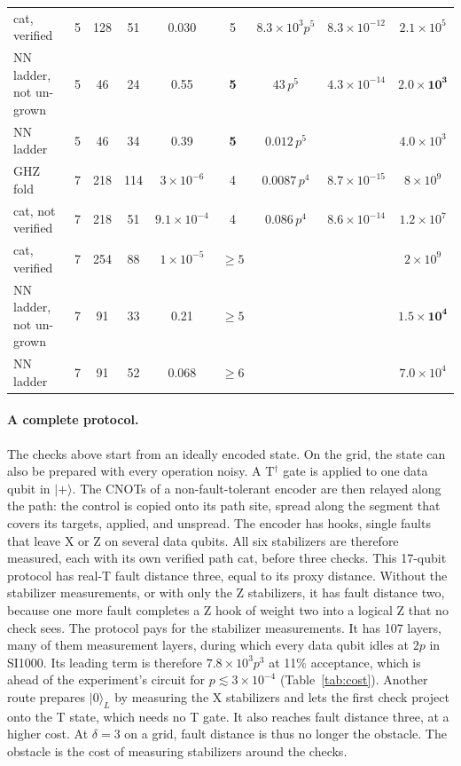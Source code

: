 \documentclass[aps,prl,reprint,twocolumn,amsmath,amssymb,floatfix,nofootinbib,superscriptaddress]{revtex4-2}
\theoremstyle{definition}
\theoremstyle{remark}
\begin{document}
\begin{table}[t]
\begin{ruledtabular}
\begin{tabular}{lcccccccc}
cat, verified & 5 & 128 & 51 & 0.030 & 5 & $8.3\times10^3p^5$ & $8.3\times10^{-12}$ & $2.1\times10^5$ \\
NN ladder, not un-grown & 5 & 46 & 24 & 0.55 & \textbf{5} & $43\,p^5$ & $4.3\times10^{-14}$ & $\mathbf{2.0\times10^3}$ \\
NN ladder & 5 & 46 & 34 & 0.39 & \textbf{5} & $0.012\,p^5$ & & $4.0\times10^3$ \\
\hline
GHZ fold & 7 & 218 & 114 & $3\times10^{-6}$ & 4 & $0.0087\,p^4$ & $8.7\times10^{-15}$ & $8\times10^9$ \\
cat, not verified & 7 & 218 & 51 & $9.1\times10^{-4}$ & 4 & $0.086\,p^4$ & $8.6\times10^{-14}$ & $1.2\times10^7$ \\
cat, verified & 7 & 254 & 88 & $1\times10^{-5}$ & $\geq5$ & & & $2\times10^9$ \\
NN ladder, not un-grown & 7 & 91 & 33 & 0.21 & $\geq5$ & & & $\mathbf{1.5\times10^4}$ \\
NN ladder & 7 & 91 & 52 & 0.068 & $\geq6$ & & & $7.0\times10^4$ \\
\end{tabular}
\end{ruledtabular}
\end{table}

\paragraph*{A complete protocol.}
The checks above start from an ideally encoded state. On the grid, the state can also be prepared with every operation noisy. A T$^\dagger$ gate is applied to one data qubit in $|{+}\rangle$. The CNOTs of a non-fault-tolerant encoder are then relayed along the path: the control is copied onto its path site, spread along the segment that covers its targets, applied, and unspread. The encoder has hooks, single faults that leave X or Z on several data qubits. All six stabilizers are therefore measured, each with its own verified path cat, before three checks. This 17-qubit protocol has real-T fault distance three, equal to its proxy distance. Without the stabilizer measurements, or with only the Z stabilizers, it has fault distance two, because one more fault completes a Z hook of weight two into a logical Z that no check sees. The protocol pays for the stabilizer measurements. It has 107 layers, many of them measurement layers, during which every data qubit idles at $2p$ in SI1000. Its leading term is therefore $7.8\times10^3p^3$ at 11\% acceptance, which is ahead of the experiment's circuit for $p\lesssim3\times10^{-4}$ (Table~\ref{tab:cost}). Another route prepares $|0\rangle_L$ by measuring the X stabilizers and lets the first check project onto the T state, which needs no T gate. It also reaches fault distance three, at a higher cost. At $\delta=3$ on a grid, fault distance is thus no longer the obstacle. The obstacle is the cost of measuring stabilizers around the checks.
\end{document}
